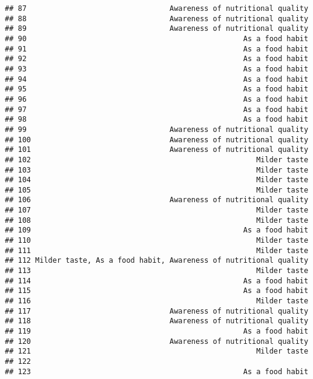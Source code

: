 \documentclass[
]{article}
\begin{document}
\begin{verbatim}
## 87                                 Awareness of nutritional quality
## 88                                 Awareness of nutritional quality
## 89                                 Awareness of nutritional quality
## 90                                                  As a food habit
## 91                                                  As a food habit
## 92                                                  As a food habit
## 93                                                  As a food habit
## 94                                                  As a food habit
## 95                                                  As a food habit
## 96                                                  As a food habit
## 97                                                  As a food habit
## 98                                                  As a food habit
## 99                                 Awareness of nutritional quality
## 100                                Awareness of nutritional quality
## 101                                Awareness of nutritional quality
## 102                                                    Milder taste
## 103                                                    Milder taste
## 104                                                    Milder taste
## 105                                                    Milder taste
## 106                                Awareness of nutritional quality
## 107                                                    Milder taste
## 108                                                    Milder taste
## 109                                                 As a food habit
## 110                                                    Milder taste
## 111                                                    Milder taste
## 112 Milder taste, As a food habit, Awareness of nutritional quality
## 113                                                    Milder taste
## 114                                                 As a food habit
## 115                                                 As a food habit
## 116                                                    Milder taste
## 117                                Awareness of nutritional quality
## 118                                Awareness of nutritional quality
## 119                                                 As a food habit
## 120                                Awareness of nutritional quality
## 121                                                    Milder taste
## 122                                                                
## 123                                                 As a food habit

\end{verbatim}
\end{document}
